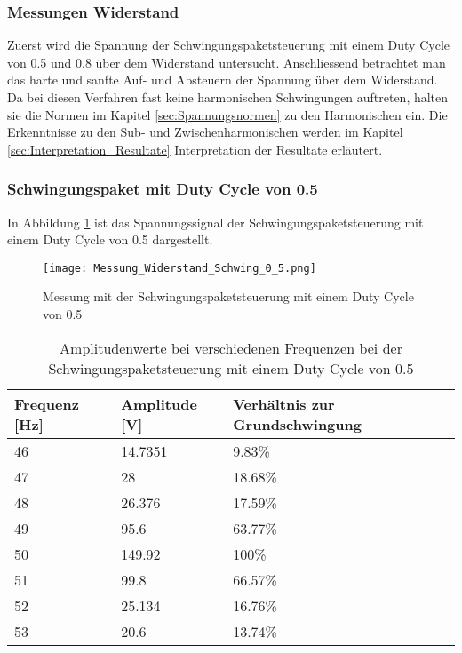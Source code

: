 \subsubsection{Messungen Widerstand}

Zuerst wird die Spannung der Schwingungspaketsteuerung mit einem Duty Cycle von 0.5 und 0.8 über dem Widerstand untersucht. Anschliessend betrachtet man das harte und sanfte Auf- und Absteuern der Spannung über dem Widerstand. Da bei diesen Verfahren fast keine harmonischen Schwingungen auftreten, halten sie die Normen im Kapitel \ref{sec:Spannungsnormen} zu den Harmonischen ein. Die Erkenntnisse zu den Sub- und Zwischenharmonischen werden im Kapitel \ref{sec:Interpretation_Resultate} Interpretation der Resultate erläutert.

\subsubsection*{Schwingungspaket mit Duty Cycle von 0.5}

In Abbildung \ref{fig:Mess_Schwing_50} ist das Spannungssignal der Schwingungspaketsteuerung mit einem Duty Cycle von 0.5 dargestellt.


\begin{figure}[ht!]
	\centering
	\texttt{[image: Messung\_Widerstand\_Schwing\_0\_5.png]}	
	\caption{Messung mit der Schwingungspaketsteuerung mit einem Duty Cycle von 0.5}\label{fig:Mess_Schwing_50}
\end{figure}


\newpage
\begin{table}[ht!]
	\centering
	\begin{tabular}{|l|l|l|}
		\hline
		Frequenz {[}Hz{]} & Amplitude {[}V{]} & Verhältnis zur Grundschwingung \\ \hline
		46                & 14.7351           & 9.83\%                         \\ \hline
		47                & 28                & 18.68\%                        \\ \hline
		48                & 26.376            & 17.59\%                        \\ \hline
		49                & 95.6              & 63.77\%                        \\ \hline
		50                & 149.92            & 100\%                          \\ \hline
		51                & 99.8              & 66.57\%                        \\ \hline
		52                & 25.134            & 16.76\%                        \\ \hline
		53                & 20.6              & 13.74\%                        \\ \hline
	\end{tabular}
\caption{Amplitudenwerte bei verschiedenen Frequenzen bei der Schwingungspaketsteuerung mit einem Duty Cycle von 0.5}\label{tab:Mess_Spannung_Schwing_50}
\end{table}

